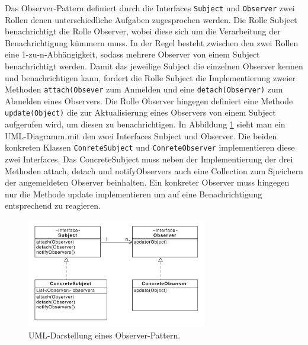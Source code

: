 Das Observer-Pattern definiert durch die Interfaces \texttt{Subject} und \texttt{Observer} zwei Rollen denen unterschiedliche Aufgaben zugesprochen werden. Die Rolle Subject benachrichtigt die Rolle Observer, wobei diese sich um die Verarbeitung der Benachrichtigung kümmern muss. In der Regel besteht zwischen den zwei Rollen eine 1-zu-n-Abhängigkeit, sodass mehrere Observer von einem Subject benachrichtigt werden.
Damit das jeweilige Subject die einzelnen Observer kennen und benachrichtigen kann, fordert die Rolle Subject die Implementierung zweier Methoden \texttt{attach(Obsever} zum Anmelden  und eine \texttt{detach(Observer)} zum Abmelden eines Observers.
Die Rolle Observer hingegen definiert eine Methode \texttt{update(Object)} die zur Aktualisierung eines Observers von einem Subject aufgerufen wird, um diesen zu benachrichtigen.
In Abbildung \ref{observerdiagramm} sieht man ein UML-Diagramm mit den zwei Interfaces Subject und Observer. Die beiden konkreten Klassen \texttt{ConreteSubject} und \texttt{ConreteObserver} implementieren diese zwei Interfaces. Das ConcreteSubject muss neben der Implementierung der drei Methoden attach, detach und notifyObservers auch eine Collection zum Speichern der angemeldeten Observer beinhalten. Ein konkreter Observer muss hingegen nur die Methode update implementieren um auf eine Benachrichtigung entsprechend zu reagieren.

\begin{figure}[h!]
\centering
\includegraphics[width=0.7\textwidth]{./paper/observer/observer}
\caption{UML-Darstellung eines Observer-Pattern.}
\label{observerdiagramm}
\end{figure} 
